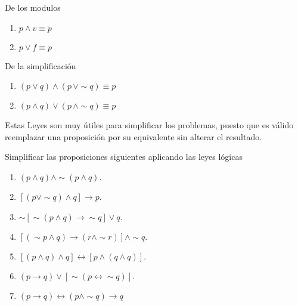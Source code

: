 \begin{ley}{De los modulos}
\begin{enumerate}
\item $p\wedge v\equiv p$ 
\item $p\vee f\equiv p$
\end{enumerate}
\end{ley}

\begin{ley}{De la simplificación}
\begin{enumerate}
\item $\left(p\vee q\right)\wedge\left(p\,\vee\sim q\right)\equiv p$
\item $\left(p\wedge q\right)\vee\left(p\,\wedge\sim q\right)\equiv p$
\end{enumerate}
\end{ley}

\obs Estas Leyes son muy útiles para simplificar los problemas, puesto
que es válido reemplazar una proposición por su equivalente sin alterar
el resultado. 

\begin{ejemplo}

Simplificar las proposiciones siguientes aplicando las leyes lógicas 
\begin{enumerate}
\item $\left(p\wedge q\right)\wedge\sim\left(p\wedge q\right).$
\item $\left[\left(p\vee\sim q\right)\wedge q\right]\rightarrow p$.
\item $\sim\left[\sim\left(p\wedge q\right)\rightarrow\sim q\right]\vee q.$
\item $\left[\left(\sim p\wedge q\right)\rightarrow\left(r\wedge\sim r\right)\right]\wedge\sim q.$
\item $\left[\left(p\wedge q\right)\wedge q\right]\longleftrightarrow\left[p\wedge\left(q\wedge q\right)\right].$
\item $\left(p\rightarrow q\right)\vee\left[\sim\left(p\longleftrightarrow\sim q\right)\right].$
\item $(p\rightarrow q)\leftrightarrow{(p\wedge\sim q)\rightarrow q}$
\end{enumerate}
\end{ejemplo}


